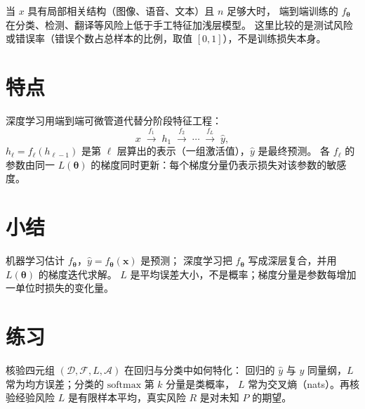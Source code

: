 当 $x$ 具有局部相关结构（图像、语音、文本）且 $n$ 足够大时，
端到端训练的 $f_{\bm{\theta}}$ 在分类、检测、翻译等风险上低于手工特征加浅层模型。
这里比较的是测试风险或错误率（错误个数占总样本的比例，取值 $[0,1]$），不是训练损失本身。

\section{特点}

深度学习用端到端可微管道代替分阶段特征工程：
\[
x\;\xrightarrow{f_1}\;h_1\;\xrightarrow{f_2}\;\cdots\;\xrightarrow{f_L}\;\hat{y},
\]
$h_{\ell}=f_{\ell}(h_{\ell-1})$ 是第 $\ell$ 层算出的表示（一组激活值），$\hat{y}$ 是最终预测。
各 $f_{\ell}$ 的参数由同一 $L(\bm{\theta})$ 的梯度同时更新：每个梯度分量仍表示损失对该参数的敏感度。

\section{小结}

机器学习估计 $f_{\bm{\theta}}$，$\hat{y}=f_{\bm{\theta}}(\bm{x})$ 是预测；
深度学习把 $f_{\bm{\theta}}$ 写成深层复合，并用 $L(\bm{\theta})$ 的梯度迭代求解。
$L$ 是平均误差大小，不是概率；梯度分量是参数每增加一单位时损失的变化量。

\section{练习}

核验四元组 $(\mathcal{D},\mathcal{F},L,\mathcal{A})$ 在回归与分类中如何特化：
回归的 $\hat{y}$ 与 $y$ 同量纲，$L$ 常为均方误差；分类的 $\mathrm{softmax}$ 第 $k$ 分量是类概率，
$L$ 常为交叉熵（nats）。再核验经验风险 $L$ 是有限样本平均，真实风险 $R$ 是对未知 $P$ 的期望。

